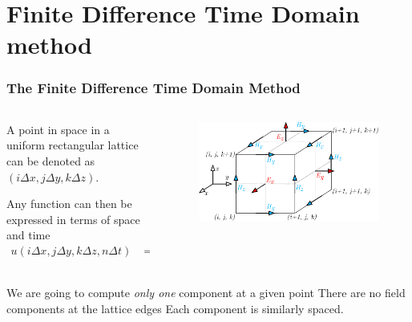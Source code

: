 \documentclass[10pt]{beamer}
\begin{document}
\section{Finite Difference Time Domain method}

\begin{frame}
    \frametitle{The Finite Difference Time Domain Method}
    \begin{columns}[T] %
        \begin{column}{.6\textwidth}
            A point in space in a uniform rectangular lattice can be denoted as $(i\Delta x,j\Delta y,k \Delta z)$.

            Any function can then be expressed in terms of space and time
            \begin{align*}
                u(i\Delta x,j\Delta y,k \Delta z, n \Delta t) & = u_{i,j,k}^n
            \end{align*}
        \end{column}
        \begin{column}{.4\textwidth}
            \begin{figure}[T!]
                \centering
                \includegraphics[width=.95\textwidth]{yee lattice.pdf}
            \end{figure}
        \end{column}%
    \end{columns}
    \begin{outline}
        \1 We are going to compute \textit{only one} component at a given point
        \1 There are no field components at the lattice edges
        \1 Each component is similarly spaced.
    \end{outline}
\end{frame}
\end{document}
